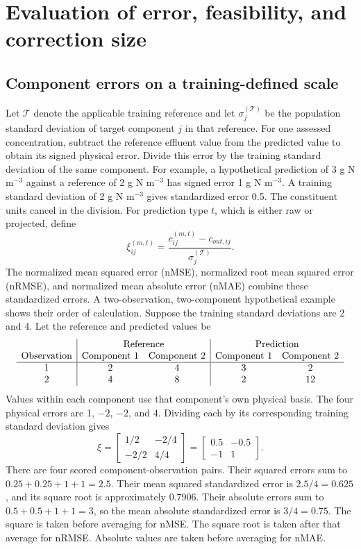 \section{Evaluation of error, feasibility, and correction size}

\subsection{Component errors on a training-defined scale}

Let $\mathcal{T}$ denote the applicable training reference and let $\sigma_j^{(\mathcal{T})}$ be the population standard deviation of target component $j$ in that reference. For one assessed concentration, subtract the reference effluent value from the predicted value to obtain its signed physical error. Divide this error by the training standard deviation of the same component. For example, a hypothetical prediction of 3 g N m$^{-3}$ against a reference of 2 g N m$^{-3}$ has signed error 1 g N m$^{-3}$. A training standard deviation of 2 g N m$^{-3}$ gives standardized error 0.5. The constituent units cancel in the division. For prediction type $t$, which is either raw or projected, define
\begin{equation}
\xi_{ij}^{(m,t)}=
\frac{c_{ij}^{(m,t)}-c_{out,ij}}{\sigma_j^{(\mathcal{T})}}.
\label{eq:projection_standardized_error}
\end{equation}
The normalized mean squared error (nMSE), normalized root mean squared error (nRMSE), and normalized mean absolute error (nMAE) combine these standardized errors. A two-observation, two-component hypothetical example shows their order of calculation. Suppose the training standard deviations are 2 and 4. Let the reference and predicted values be
\[
\begin{array}{c|cc|cc}
&\multicolumn{2}{c|}{\text{Reference}}&\multicolumn{2}{c}{\text{Prediction}}\\
\text{Observation}&\text{Component 1}&\text{Component 2}&\text{Component 1}&\text{Component 2}\\\hline
1&2&4&3&2\\
2&4&8&2&12
\end{array}
\]
Values within each component use that component's own physical basis. The four physical errors are 1, $-2$, $-2$, and 4. Dividing each by its corresponding training standard deviation gives
\[
\xi=\begin{bmatrix}1/2&-2/4\\-2/2&4/4\end{bmatrix}
=\begin{bmatrix}0.5&-0.5\\-1&1\end{bmatrix}.
\]
There are four scored component-observation pairs. Their squared errors sum to $0.25+0.25+1+1=2.5$. Their mean squared standardized error is $2.5/4=0.625$, and its square root is approximately 0.7906. Their absolute errors sum to $0.5+0.5+1+1=3$, so the mean absolute standardized error is $3/4=0.75$. The square is taken before averaging for nMSE. The square root is taken after that average for nRMSE. Absolute values are taken before averaging for nMAE.

